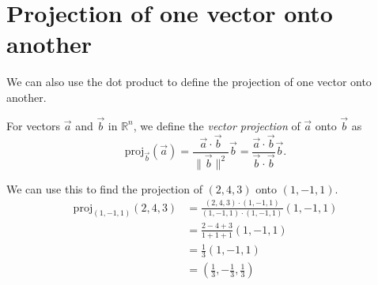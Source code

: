 \documentclass{ximera}
\begin{document}
\section*{Projection of one vector onto another}

We can also use the dot product to define the projection of one vector onto another.

\begin{definition}
For vectors $\vec{a}$ and $\vec{b}$ in $\mathbb{R}^n$, we define the \emph{vector projection} of $\vec{a}$ onto $\vec{b}$ as
\[
\textrm{proj}_{\vec{b}}(\vec{a}) = \frac{\vec{a}\cdot\vec{b}}{\|\vec{b}\|^2}\vec{b}  = \frac{\vec{a}\cdot\vec{b}}{\vec{b}\cdot\vec{b}}\vec{b}.
\]
\end{definition}

\begin{example}
We can use this to find the projection of $(2,4,3)$ onto $(1,-1,1)$.
\begin{align*}
\textrm{proj}_{(1,-1,1)}(2,4,3) &= \frac{(2,4,3)\cdot(1,-1,1)}{(1,-1,1)\cdot(1,-1,1)}(1,-1,1)\\
&= \frac{2-4+3}{1+1+1}(1,-1,1)\\
&= \frac{1}{3}(1,-1,1)\\
&= \left( \frac{1}{3},-\frac{1}{3}, \frac{1}{3}\right)
\end{align*}
\end{example}
\end{document}
